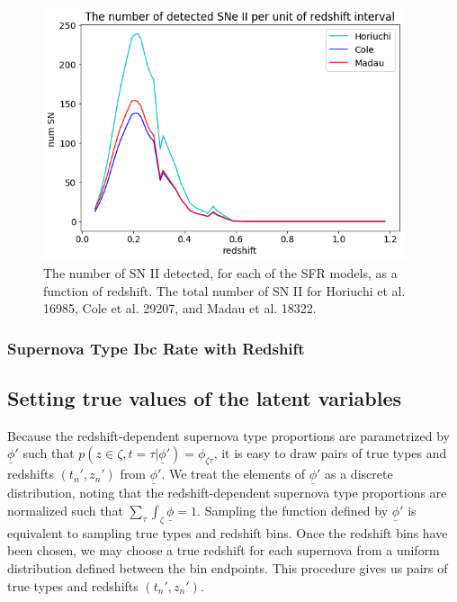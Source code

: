 \documentclass[12pt, onecolumn]{emulateapj}
\newcommand{\textul}{\underline}
\begin{document}
\begin{figure}
	\begin{center}
		\includegraphics[width=0.95\textwidth]{number_SNII_withmagntiudescatter.png}
		\caption{The number of SN II detected, for each of the SFR models, as a function of redshift. The total number of SN II for Horiuchi et al. 16985, Cole et al. 29207, and Madau et al.  18322. }
		\label{fig:SNII_lc_wz}
	\end{center}
\end{figure}

\subsubsection{Supernova Type Ibc Rate with Redshift}
\label{sec:TypeIbcRate}
 
\subsection{Setting true values of the latent variables}
\label{sec:true_latents}

Because the redshift-dependent supernova type proportions are parametrized by $\textul{\phi}'$ such that $p(z\in\zeta, t=\tau | \textul{\phi}') = \phi_{\zeta\tau}$, it is easy to draw pairs of true types and redshifts $(t_{n}', z_{n}')$ from $\textul{\phi}'$.  We treat the elements of $\textul{\phi}'$ as a discrete distribution, noting that the redshift-dependent supernova type proportions are normalized such that $\sum_{\tau}\int_{\zeta}\textul{\phi}=1$.  Sampling the function defined by $\textul{\phi}'$ is equivalent to sampling true types and redshift bins.  Once the redshift bins have been chosen, we may choose a true redshift for each supernova from a uniform distribution defined between the bin endpoints.  This procedure gives us pairs of true types and redshifts $(t_{n}', z_{n}')$.
\end{document}
